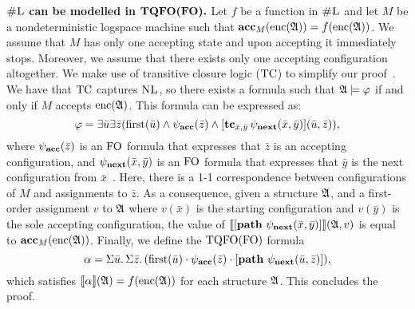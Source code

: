 \vspace{1em}
$\boldsymbol{\text{\sc \#L}}$ {\bf can be modelled in }$\boldsymbol{{\rm TQFO}({\rm FO}).}$ Let $f$ be a function in $\text{\sc \#L}$ and let $M$ be a nondeterministic logspace machine such that $\textbf{acc}_{M}({\rm enc}(\mathfrak{A})) = f({\rm enc}(\mathfrak{A}))$. We assume that $M$ has only one accepting state and upon accepting it immediately stops. Moreover, we assume that there exists only one accepting configuration altogether. We make use of transitive closure logic (${\rm TC}$) to simplify our proof~\cite{G07}. We have that ${\rm TC}$ captures $\text{\sc NL}$\cite{I83}, so there exists a formula such that $\mathfrak{A}\models\varphi$ if and only if $M$ accepts ${\rm enc}(\mathfrak{A})$. This formula can be expressed as:
$$
\varphi = \exists\bar{u}\exists\bar{z}(\operatorname{first}(\bar{u})\wedge \psi_{\bf acc}(\bar{z})\wedge[{\bf tc}_{\bar{x},\bar{y}}\,\psi_{\bf next}(\bar{x},\bar{y})](\bar{u},\bar{z})),
$$
where $\psi_{\bf acc}(\bar{z})$ is an ${\rm FO}$ formula that expresses that $\bar{z}$ is an accepting configuration, and $\psi_{\bf next}(\bar{x},\bar{y})$ is an ${\rm FO}$ formula that expresses that $\bar{y}$ is the next configuration from $\bar{x}$~\cite{G07}. Here, there is a 1-1 correspondence between configurations of $M$ and assignments to $\bar{z}$. As a consequence, given a structure $\mathfrak{A}$, and a first-order assignment $v$ to $\mathfrak{A}$ where $v(\bar{x})$ is the starting configuration and $v(\bar{y})$ is the sole accepting configuration, the value of ${\llbracket{}{[{\bf path} \,\, \psi_{\bf next}(\bar{x},\bar{y})]}\rrbracket}(\mathfrak{A},v)$ is equal to $\textbf{acc}_M({\rm enc}(\mathfrak{A}))$.
Finally, we define the ${\rm TQFO}({\rm FO})$ formula
$$
\alpha = \Sigma{\bar{u}}.\,\Sigma{\bar{z}}.\,(\operatorname{first}(\bar{u})\cdot\psi_{\bf acc}(\bar{z})\cdot[{\bf path} \,\, \psi_{\bf next}(\bar{u},\bar{z})]),
$$
which satisfies ${\llbracket{}{\alpha}\rrbracket}(\mathfrak{A}) = f({\rm enc}(\mathfrak{A}))$ for each structure $\mathfrak{A}$. This concludes the proof.


